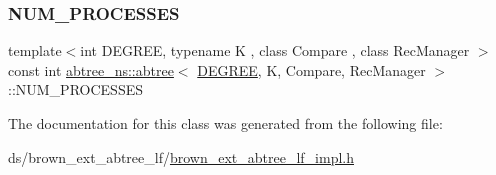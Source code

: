 \mbox{\label{classabtree__ns_1_1abtree_aad875d05d7ea76e4790313d4b21efae3}} 
\subsubsection{\texorpdfstring{N\+U\+M\+\_\+\+P\+R\+O\+C\+E\+S\+S\+ES}{NUM\_PROCESSES}}
{\footnotesize\ttfamily template$<$int D\+E\+G\+R\+EE, typename K , class Compare , class Rec\+Manager $>$ \\
const int \hyperlink{classabtree__ns_1_1abtree}{abtree\+\_\+ns\+::abtree}$<$ \hyperlink{brown__sigouin__abtree__kcas_2adapter_8h_a5d88b17d70c985f2f2b8e987037fd6dd}{D\+E\+G\+R\+EE}, K, Compare, Rec\+Manager $>$\+::N\+U\+M\+\_\+\+P\+R\+O\+C\+E\+S\+S\+ES}



The documentation for this class was generated from the following file\+:\begin{DoxyCompactItemize}
\item 
ds/brown\+\_\+ext\+\_\+abtree\+\_\+lf/\hyperlink{brown__ext__abtree__lf_2brown__ext__abtree__lf__impl_8h}{brown\+\_\+ext\+\_\+abtree\+\_\+lf\+\_\+impl.\+h}\end{DoxyCompactItemize}
